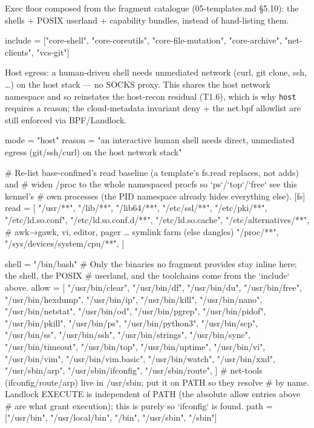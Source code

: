 Exec floor composed from the fragment catalogue (05-templates.md §5.10):
the shells + POSIX userland + capability bundles, instead of
hand-listing them.

\begin{kennelcode}
include = ["core-shell", "core-coreutils", "core-file-mutation", "core-archive", "net-clients", "vcs-git"]
\end{kennelcode}

Host egress: a human-driven shell needs unmediated network (curl, git
clone, ssh, \ldots) on the host stack --- no SOCKS proxy. This shares
the host network namespace and so reinstates the host-recon residual
(T1.6), which is why \texttt{host} requires a reason; the cloud-metadata
invariant deny + the net.bpf allowlist are still enforced via
BPF/Landlock.

\begin{kennelcode}
[net]
mode = "host"
reason = "an interactive human shell needs direct, unmediated egress (git/ssh/curl) on the host network stack"
\end{kennelcode}

\begin{kennelcode}
# Re-list base-confined's read baseline (a template's fs.read replaces, not adds) and
# widen /proc to the whole namespaced procfs so `ps`/`top`/`free` see this kennel's
# own processes (the PID namespace already hides everything else).
[fs]
read = [
    "/usr/**", "/lib/**", "/lib64/**",
    "/etc/ssl/**", "/etc/pki/**",
    "/etc/ld.so.conf", "/etc/ld.so.conf.d/**", "/etc/ld.so.cache",
    "/etc/alternatives/**",   # awk→gawk, vi, editor, pager … symlink farm (else dangles)
    "/proc/**",
    "/sys/devices/system/cpu/**",
]
\end{kennelcode}

\begin{kennelcode}
[exec]
shell = "/bin/bash"
# Only the binaries no fragment provides stay inline here; the shell, the POSIX
# userland, and the toolchains come from the `include` above.
allow = [
    "/usr/bin/clear",
    "/usr/bin/df",
    "/usr/bin/du",
    "/usr/bin/free",
    "/usr/bin/hexdump",
    "/usr/bin/ip",
    "/usr/bin/kill",
    "/usr/bin/nano",
    "/usr/bin/netstat",
    "/usr/bin/od",
    "/usr/bin/pgrep",
    "/usr/bin/pidof",
    "/usr/bin/pkill",
    "/usr/bin/ps",
    "/usr/bin/python3",
    "/usr/bin/scp",
    "/usr/bin/ss",
    "/usr/bin/ssh",
    "/usr/bin/strings",
    "/usr/bin/sync",
    "/usr/bin/timeout",
    "/usr/bin/top",
    "/usr/bin/uptime",
    "/usr/bin/vi",
    "/usr/bin/vim",
    "/usr/bin/vim.basic",
    "/usr/bin/watch",
    "/usr/bin/xxd",
    "/usr/sbin/arp",
    "/usr/sbin/ifconfig",
    "/usr/sbin/route",
]
# net-tools (ifconfig/route/arp) live in /usr/sbin; put it on PATH so they resolve
# by name. Landlock EXECUTE is independent of PATH (the absolute allow entries above
# are what grant execution); this is purely so `ifconfig` is found.
path = ["/usr/bin", "/usr/local/bin", "/bin", "/usr/sbin", "/sbin"]
\end{kennelcode}

